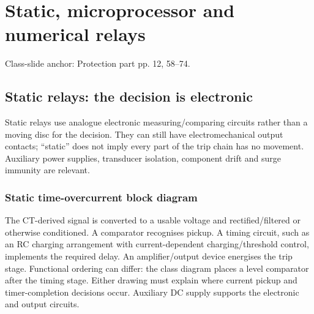 \documentclass[11pt,a4paper]{article}
\newcommand{\slides}[1]{{\small\color{muted}\textsf{Class-slide anchor: #1.}}\par}
\newcommand{\chapterstart}[2]{\clearpage\section{#1}\label{#2}}
\begin{document}
\chapterstart{Static, microprocessor and numerical relays}{digital}
\slides{Protection part pp. 12, 58--74}
\subsection{Static relays: the decision is electronic}
Static relays use analogue electronic measuring/comparing circuits rather than a moving disc for the decision. They can still have electromechanical output contacts; ``static'' does not imply every part of the trip chain has no movement. Auxiliary power supplies, transducer isolation, component drift and surge immunity are relevant.
\subsubsection{Static time-overcurrent block diagram}
\begin{center}
\end{center}
The CT-derived signal is converted to a usable voltage and rectified/filtered or otherwise conditioned. A comparator recognises pickup. A timing circuit, such as an RC charging arrangement with current-dependent charging/threshold control, implements the required delay. An amplifier/output device energises the trip stage. Functional ordering can differ: the class diagram places a level comparator after the timing stage. Either drawing must explain where current pickup and timer-completion decisions occur. Auxiliary DC supply supports the electronic and output circuits.
\end{document}
